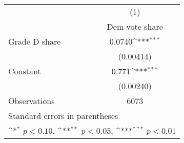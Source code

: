 {
\def\sym#1{\ifmmode^{#1}\else\(^{#1}\)\fi}
\begin{tabular}{l*{1}{c}}
\toprule
                    &\multicolumn{1}{c}{(1)}\\
                    &\multicolumn{1}{c}{Dem vote share}\\
\midrule
Grade D share       &      0.0740\sym{***}\\
                    &   (0.00414)         \\
\addlinespace
Constant            &       0.771\sym{***}\\
                    &   (0.00240)         \\
\midrule
Observations        &        6073         \\
\bottomrule
\multicolumn{2}{l}{\footnotesize Standard errors in parentheses}\\
\multicolumn{2}{l}{\footnotesize \sym{*} \(p<0.10\), \sym{**} \(p<0.05\), \sym{***} \(p<0.01\)}\\
\end{tabular}
}
